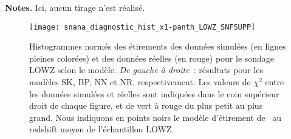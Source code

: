 \documentclass[../main/main.tex]{subfiles}
\begin{document}
\begin{table}[ht]
    \centering
        \caption[Comparaison de la capacité de chaque simulation à représenter
        les données d'étirement selon le sondage]{Valeurs de $\chi^2$ donnant la
            comparaison de la capacité de chaque simulation à représenter les
        données d'étirement pour chaque sondage simulé.}
        \label{tab:chix1}
    \begin{threeparttable}
        \begin{tablenotes}[flushleft]
            \item \small \textbf{\hspace{-3,2pt}Notes.} Ici, aucun tirage n'est
                réalisé.
        \end{tablenotes}
    \end{threeparttable}
\end{table}

\begin{figure}[ht]
    \centering
    \texttt{[image: snana\_diagnostic\_hist\_x1-panth\_LOWZ\_SNFSUPP]}
    \caption[Histogrammes uni-dimensionnels des étirements des données simulées
    et réelles pour l'échantillon LOWZ]{Histogrammes normés des étirements des
        données simulées (en lignes pleines colorées) et des données réelles (en
        rouge) pour le sondage LOWZ selon le modèle. \textit{De gauche à
        droite}~: résultats pour les modèles SK, BP, NN et NR, respectivement.
        Les valeurs de $\chi^2$ entre les données simulées et réelles sont
        indiquées dans le coin supérieur droit de chaque figure, et de vert à
        rouge du plus petit au plus grand. Nous indiquons en points noirs le
        modèle d'étirement de~ au redshift moyen de
    l'échantillon LOWZ.}
    \label{fig:lowz1d}
\end{figure}
\end{document}
